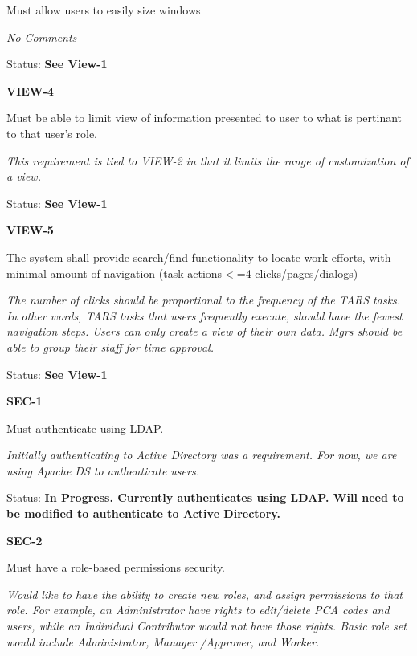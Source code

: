 \noindent Must allow users to easily size windows

 \textit{No Comments}

\textit{ }Status: \textbf{See View-1}\textit{}\\

\noindent 

\noindent \textbf{VIEW-4}

\noindent Must be able to limit view of information presented to user to what is pertinant to that user's role.

\textit{This requirement is tied to VIEW-2 in that it limits the range of customization of a view.}

Status: \textbf{See View-1}\\

\noindent 

\noindent \textbf{VIEW-5}

\noindent The system shall provide search/find functionality to locate work efforts, with minimal amount of navigation (task actions$<$=4 clicks/pages/dialogs)

\noindent \textit{The number of clicks should be proportional to the frequency of the TARS tasks. In other words, TARS tasks that users frequently execute, should have the fewest navigation steps. Users can only create a view of their own data. Mgrs should be able to group their staff for time approval.}

\noindent Status: \textbf{See View-1}\\

\noindent 

\noindent \textbf{SEC-1}

\noindent Must authenticate using LDAP.

\noindent \textit{Initially authenticating to Active Directory was a requirement. For now, we are using Apache DS to authenticate users. }

\noindent Status: \textbf{In Progress.  Currently authenticates using LDAP.  Will need to be modified to authenticate to Active Directory.}\textit{}\\

\noindent \textit{}

\noindent \textbf{SEC-2}

\noindent Must have a role-based permissions security.

\noindent \textit{Would like to have the ability to create new roles, and assign permissions to that role. For example, an Administrator have rights to edit/delete PCA codes and users, while an Individual Contributor would not have those rights. Basic role set would include Administrator, Manager /Approver, and Worker.}

